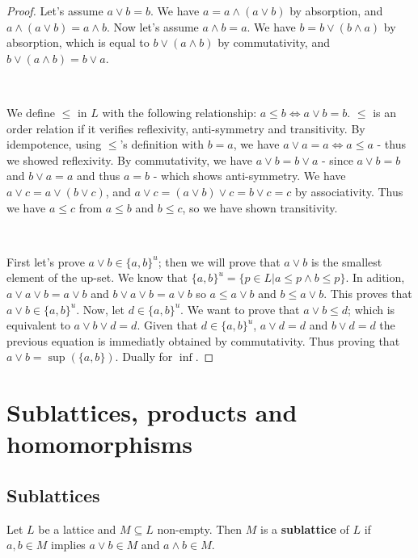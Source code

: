 \begin{proof} Let's assume $a \lor b = b$. We have $a = a \land (a \lor b)$ by
absorption, and $a \land (a \lor b) = a \land b$. Now let's assume $a \land b =
a$. We have $b = b \lor (b \land a)$ by absorption, which is equal to $b \lor (a
\land b)$ by commutativity, and $b \lor (a \land b) = b \lor a$.

\

We define $\leq$ in $L$ with the following relationship: $a \leq b \iff a \lor b
= b$. $\leq$ is an order relation if it verifies reflexivity, anti-symmetry and
transitivity. By idempotence, using $\leq$'s definition with $b=a$, we have $a
\lor a = a \iff a \leq a$ - thus we showed reflexivity. By commutativity, we
have $a \lor b = b \lor a$ - since $a \lor b = b$ and $b \lor a = a$ and thus $a
= b$ - which shows anti-symmetry. We have $a \lor c = a \lor (b \lor c)$, and $a
\lor c = (a \lor b) \lor c = b \lor c = c$ by associativity. Thus we have $a
\leq c$ from $a \leq b$ and $b \leq c$, so we have shown transitivity.

\

First let's prove $a \lor b \in \{a,b\}^u$; then we will prove that $a \lor b$
is the smallest element of the up-set. We know that $\{a,b\}^u =\{p \in L | a
\leq p \land b \leq p\}$. In adition, $a \lor a \lor b = a \lor b$ and $ b \lor
a \lor b = a \lor b$ so $a \leq a \lor b$ and $b \leq a \lor b$. This proves
that $a \lor b \in \{a,b\}^u$. Now, let $d \in \{a,b\}^u$. We want to prove that
$a \lor b \leq d$; which is equivalent to $a \lor b \lor d = d$. Given that $d
\in \{a,b\}^u$, $a \lor d = d$ and $b \lor d = d$ the previous equation is
immediatly obtained by commutativity. Thus proving that $a \lor b =
\sup(\{a,b\})$. Dually for $\inf$.

\end{proof}

\section{Sublattices, products and homomorphisms}

\subsection{Sublattices}

\begin{definition}[sublattice] Let $L$ be a lattice and $M \subseteq L$
non-empty. Then $M$ is a \textbf{sublattice} of $L$ if $a,b \in M$ implies $a
\lor b \in M$ and $a \land b \in M$.
\end{definition}

